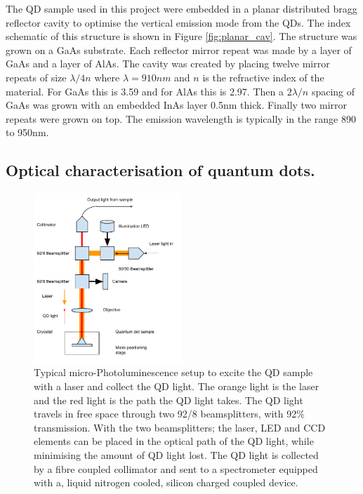The QD sample used in this project were embedded in a planar distributed bragg
reflector cavity to optimise the vertical emission mode from the
QDs\cite{bennett2005microcavity, 1367-2630-10-4-043035, Bennett_05}. The index
schematic of this structure is shown in Figure \ref{fig:planar_cav}. The
structure was grown on a GaAs substrate. Each reflector mirror repeat was made
by a layer of GaAs and a layer of AlAs. The cavity was created by placing twelve
mirror repeats of size $\lambda/4n$ where $\lambda = 910nm$ and $n$ is the
refractive index of the material. For GaAs this is 3.59 and for AlAs this is
2.97. Then a $2\lambda/n$ spacing of GaAs was grown with an embedded InAs layer
0.5nm thick. Finally two mirror repeats were grown on top. The emission
wavelength is typically in the range 890 to 950nm.

\subsection{Optical characterisation of quantum dots.}

\begin{figure}[h!] \begin{center}
\includegraphics[width=0.5\textwidth]{images/qd_char.pdf} \caption{
Typical micro-Photoluminescence setup to excite the QD sample with a laser and
collect the QD light. The orange light is the laser and the red light is the
path the QD light takes. The QD light travels in free space through two 92/8
beamsplitters, with 92\% transmission. With the two beamsplitters; the laser,
LED and CCD elements can be placed in the optical path of the QD light, while
minimising the amount of QD light lost. The QD light is collected by a  fibre
coupled collimator and sent to a spectrometer equipped with a, liquid nitrogen
cooled, silicon charged coupled device.
} \label{fig:qd_char} \end{center} \end{figure}


